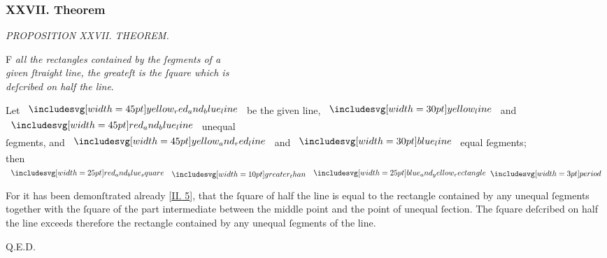 \documentclass[12pt,preview]{standalone}
\begin{document}
\subsubsection{XXVII. Theorem}

\begin{minipage}[t]{0.33\textwidth}
    \vspace{40pt}
    
\end{minipage}%
\hfill
\begin{minipage}[t]{0.64\textwidth}
    \vspace{0pt}

    \begin{center}
        \textit{PROPOSITION XXVII. THEOREM.}\label{book6pr27} \\
    \end{center}

    \hfill

    \begin{center}
        \raggedright \lettrine[lines=4, loversize=1, nindent=0pt]{}{}F \textit{all the rectangles contained by the ſegments of a\\ given ſtraight line, the greateſt is the ſquare which is\\ deſcribed on half the line}.
    \end{center}

    \hfill

    \hfill

    \begin{center}
        Let $\bimg{yellow_red_and_blue_line}$ be the given line, $\yellowline$ and $\bimg{red_and_blue_line}$ unequal\\
        ſegments, and $\bimg{yellow_and_red_line}$ and $\blueline$ equal ſegments;\\
        then $\img{red_and_blue_square} \bgt \img{blue_and_yellow_rectangle} \bperiod$
    \end{center}

    \hfill

    \raggedright For it has been demonſtrated already [\hyperref[book2pr5]{\textsc{II.} 5}], that the ſquare of half the line is equal to the rectangle contained by any unequal ſegments together with the ſquare of the part intermediate between the middle point and the point of unequal ſection. The ſquare deſcribed on half the line exceeds therefore the rectangle contained by any unequal ſegments of the line.

    \hfill

    \hfill Q.E.D.
\end{minipage}%
\end{document}
